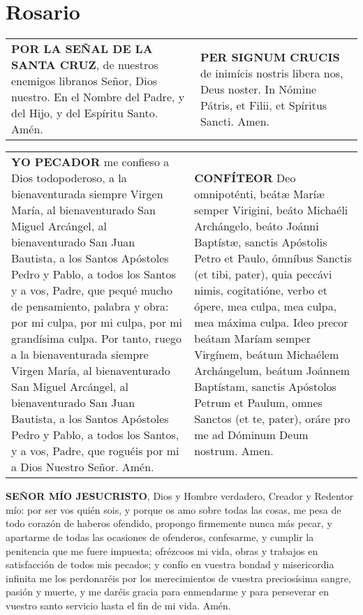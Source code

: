 \documentclass[./rosary.tex]{subfiles}
\begin{document}
\chapter*{Rosario}

\label{crossSignal}
\begin{longtable} { p{} p{} }
    \textbf{POR LA SEÑAL DE LA SANTA CRUZ}, de nuestros enemigos libranos Señor, Dios nuestro. En el Nombre del Padre,
    y del Hijo, y del Espíritu Santo. Amén.

     &

    \textbf{PER SIGNUM CRUCIS} de inimícis nostris libera nos, Deus noster. In Nómine Pátris, et Filii, et Spíritus Sancti. Amen.
\end{longtable}

\label{iConfess}
\begin{longtable} { p{} p{} }
    \textbf{YO PECADOR} me confieso a Dios todopoderoso, a la bienaventurada siempre Virgen María, al bienaventurado San Miguel Arcángel,
    al bienaventurado San Juan Bautista, a los Santos Apóstoles Pedro y Pablo, a todos los Santos y a vos, Padre, que pequé mucho
    de pensamiento, palabra y obra: por mi culpa, por mi culpa, por mi grandísima culpa. Por tanto, ruego a la bienaventurada
    siempre Virgen María, al bienaventurado San Miguel Arcángel, al bienaventurado San Juan Bautista, a los Santos Apóstoles
    Pedro y Pablo, a todos los Santos, y a vos, Padre, que roguéis por mi a Dios Nuestro Señor. Amén.
    
     &

    \textbf{CONFÍTEOR} Deo omnipoténti, beátæ Maríæ semper Virigini, beáto Michaéli Archángelo, beáto Joánni Baptístæ, sanctis Apóstolis Petro et Paulo,
    ómníbus Sanctis (et tibi, pater), quia peccávi nimis, cogitatióne, verbo et ópere, mea culpa, mea culpa, mea máxima culpa. Ideo precor beátam
    Maríam semper Virgínem, beátum Michaélem Archángelum, beátum Joánnem Baptístam, sanctis Apóstolos Petrum et Paulum, omnes Sanctos (et te, pater),
    oráre pro me ad Dóminum Deum nostrum. Amen.
\end{longtable}

\label{contrition}
\textbf{SEÑOR MÍO JESUCRISTO}, Dios y Hombre verdadero, Creador y Redentor mío: por ser vos quién sois, y porque os amo sobre todas las cosas,
me pesa de todo corazón de haberos ofendido, propongo firmemente nunca más pecar, y apartarme de todas las ocasiones de ofenderos,
confesarme, y cumplir la penitencia que me fuere impuesta; ofrézcoos mi vida, obras y trabajos en satisfacción de todos mis pecados;
y confío en vuestra bondad y misericordia infinita me los perdonaréis por los merecimientos de vuestra preciosísima sangre, pasión y muerte,
y me daréis gracia para enmendarme y para perseverar en vuestro santo servicio hasta el fin de mi vida. Amén.
\end{document}
